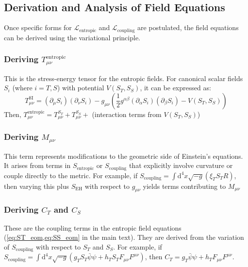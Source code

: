 \documentclass[11pt,a4paper]{article} %
\newcommand{\ST}{S_T}
\newcommand{\SSp}{S_S} %
\newcommand{\Scoupling}{S_{\text{coupling}}}
\newcommand{\SEH}{S_{\text{EH}}}
\newcommand{\Sentropic}{S_{\text{entropic}}}
\newcommand{\Tmu}{T} %
\newcommand{\Mmu}{M} %
\newcommand{\Tmnentropic}{T^{\text{entropic}}_{\mu\nu}}
\begin{document}
\subsection{Derivation and Analysis of Field Equations}
Once specific forms for $\mathcal{L}_{\text{entropic}}$ and $\mathcal{L}_{\text{coupling}}$ are postulated, the field equations can be derived using the variational principle.

\subsubsection{Deriving $\Tmnentropic$}
This is the stress-energy tensor for the entropic fields. For canonical scalar fields $S_i$ (where $i=T,S$) with potential $V(\ST,\SSp)$, it can be expressed as:
\begin{equation*}
\Tmu^{\text{SI}  }_{\mu\nu}=(\partial_\mu S_i)(\partial_\nu S_i)-g_{\mu\nu}\left(\frac{1}{2}g^{\alpha\beta}(\partial_\alpha S_i)(\partial_\beta S_i)-V(\ST,\SSp)\right)
\end{equation*}
Then, $\Tmnentropic=\Tmu^{\ST  }_{\mu\nu}+\Tmu^{\SSp  }_{\mu\nu}+$ (interaction terms from $V(\ST,\SSp)$)

\subsubsection{Deriving $\Mmu_{\mu\nu}$}
This term represents modifications to the geometric side of Einstein's equations. It arises from terms in $\Sentropic$ or $\Scoupling$ that explicitly involve curvature or couple directly to the metric. For example, if $\Scoupling=\int\text{d}^4x\sqrt{-g}(\xi_T\ST R)$, then varying this plus $\SEH$ with respect to $g_{\mu\nu}$ yields terms contributing to $\Mmu_{\mu\nu}$

\subsubsection{Deriving $C_T$ and $C_S$}
\label{app:B.3.3}
These are the coupling terms in the entropic field equations (\cref{eq:ST_eom,eq:SS_eom} in the main text). They are derived from the variation of $\Scoupling$ with respect to $\ST$ and $\SSp$. For example, if $\Scoupling=\int\text{d}^4x\sqrt{-g}(g_T\ST\bar{\psi}\psi+h_T\ST F_{\mu\nu}F^{\mu\nu})$, then $C_T=g_T\bar{\psi}\psi+h_T F_{\mu\nu}F^{\mu\nu}$.
\end{document}
